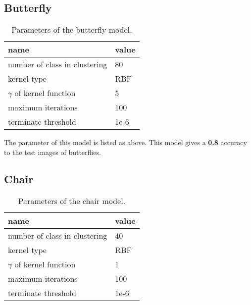 \subsection{Butterfly}

\begin{table}[H]
\centering

\begin{tabular}{|l|l|}
\hline
\textbf{name}                 & \textbf{value} \\ \hline
number of class in clustering & 80             \\ \hline
kernel type                   & RBF            \\ \hline
$\gamma$ of kernel function   & 5              \\ \hline
maximum iterations            & 100            \\ \hline
terminate threshold           & 1e-6           \\ \hline
\end{tabular}
\caption{Parameters of the butterfly model.}
\end{table}

The parameter of this model is listed as above.
This model gives a \textbf{0.8} accuracy to the test images of butterflies.



\subsection{Chair}

\begin{table}[H]
\centering

\begin{tabular}{|l|l|}
\hline
\textbf{name}                 & \textbf{value} \\ \hline
number of class in clustering & 40             \\ \hline
kernel type                   & RBF            \\ \hline
$\gamma$ of kernel function   & 1              \\ \hline
maximum iterations            & 100            \\ \hline
terminate threshold           & 1e-6           \\ \hline
\end{tabular}
\caption{Parameters of the chair model.}
\end{table}

